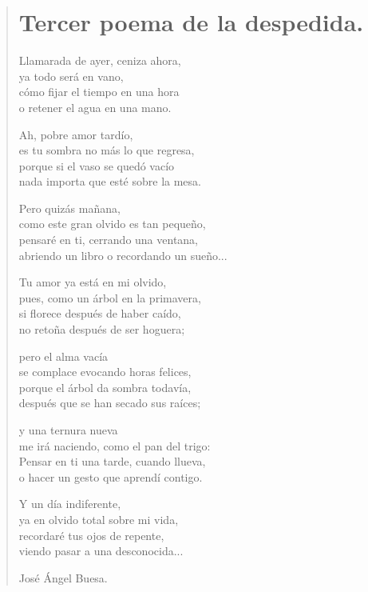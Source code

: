 \documentclass[11pt, portrait, twoside, notitlepage, openright]{book}
\begin{document}
\newpage
\begin{verse}
\begin{center}
\section{Tercer poema de la despedida.}
\end{center}
Llamarada de ayer, ceniza ahora,\\
ya todo será en vano,\\
cómo fijar el tiempo en una hora\\
o retener el agua en una mano.
\newline

Ah, pobre amor tardío,\\
es tu sombra no más lo que regresa,\\
porque si el vaso se quedó vacío\\
nada importa que esté sobre la mesa.
\newline

Pero quizás mañana,\\
como este gran olvido es tan pequeño,\\
pensaré en ti, cerrando una ventana,\\
abriendo un libro o recordando un sueño...
\newline

Tu amor ya está en mi olvido,\\
pues, como un árbol en la primavera,\\
si florece después de haber caído,\\
no retoña después de ser hoguera;
\newpage

pero el alma vacía\\
se complace evocando horas felices,\\
porque el árbol da sombra todavía,\\
después que se han secado sus raíces;
\newline

y una ternura nueva\\
me irá naciendo, como el pan del trigo:\\
Pensar en ti una tarde, cuando llueva,\\
o hacer un gesto que aprendí contigo.
\newline

Y un día indiferente,\\
ya en olvido total sobre mi vida,\\
recordaré tus ojos de repente,\\
viendo pasar a una desconocida...
\newline

José Ángel Buesa.
\end{verse}
\end{document}
